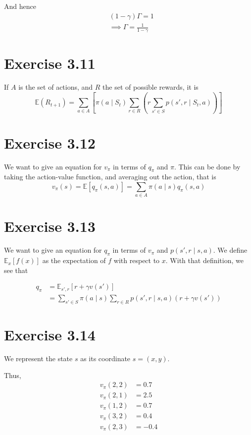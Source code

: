 \documentclass[a4paper,11pt,reqno]{amsart}
\begin{document}
And hence
\begin{align}
    &(1 - \gamma ) \Gamma =1\\
    & \implies \Gamma = \frac{1}{1 - \gamma }
\end{align}

\section*{Exercise 3.11}
If $A$ is the set of actions, and $R$ the set of possible rewards, it is
\[
    \mathbb{E}(R _{t +1}) = \sum_{a \in A} \left[ \pi (a \mid S_t) 
        \sum_{r \in R} \left( r \sum_{s' \in S} p(s',r \mid S_t ,a) \right) 
    \right] 
\]

\section*{Exercise 3.12}
We want to give an equation for $v _{\pi }$ in terms of $q _{\pi }$ and $\pi $. This can be done by taking the action-value function, and averaging out the action, that is
\[
    v _{\pi }(s) = \mathbb{E} \left[ q _{\pi }(s, a) \right] = \sum_{a \in A} \pi (a \mid s) q _{\pi }(s, a)
\]

\section*{Exercise 3.13}
We want to give an equation for $q _{\pi }$ in terms of $v _{\pi }$ and $p(s',r \mid s,a)$. We define $\mathbb{E} _{x} \left[ f(x) \right] $ as the expectation of $f$ with respect to $x$. With that definition, we see that

\begin{align}
    q _{\pi }&= \mathbb{E} _{s', r} \left[ r + \gamma v(s') \right] \\
    &= \sum_{s' \in S} \pi (a \mid s) \sum_{r \in R} p(s', r \mid s, a)(r + \gamma v(s'))
\end{align}

\section*{Exercise 3.14}

We represent the state $s$ as its coordinate $s = (x, y)$. 

Thus,
\begin{align}
    v _{\pi }(2, 2) &= 0.7\\
    v _{\pi }(2, 1) &= 2.5\\
    v _{\pi} (1, 2) &= 0.7 \\
    v _{\pi }(3,2) &= 0.4\\
    v _{\pi }(2, 3) &= -0.4
\end{align}
\end{document}
